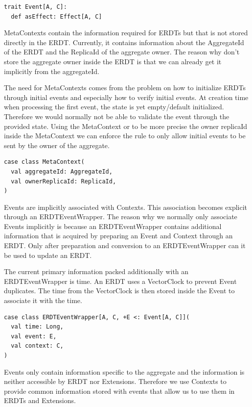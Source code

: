 \documentclass[
	ngerman,
	ruledheaders=section,   %
	class=report,		    %
	thesis={type=bachelor}, %
	accentcolor=9c,			%
	custommargins=true,    %
	marginpar=false,        %
	parskip=half-,          %
	fontsize=11pt,          %
]{tudapub}
\begin{document}
\begin{lstlisting}
trait Event[A, C]:
  def asEffect: Effect[A, C]
\end{lstlisting}

MetaContexts contain the information required for ERDTs but that is not stored directly in the ERDT. Currently, it contains information about the AggregateId of the ERDT and the ReplicaId of the aggregate owner. The reason why don't store the aggregate owner inside the ERDT is that we can already get it implicitly from the aggregateId.

The need for MetaContexts comes from the problem on how to initialize ERDTs through initial events and especially how to verify initial events. At creation time when processing the first event, the state is yet empty/default initialized. Therefore we would normally not be able to validate the event through the provided state. Using the MetaContext or to be more precise the owner replicaId inside the MetaContext we can enforce the rule to only allow initial events to be sent by the owner of the aggregate.

\begin{lstlisting}
case class MetaContext(
  val aggregateId: AggregateId,
  val ownerReplicaId: ReplicaId,
)
\end{lstlisting}

Events are implicitly associated with Contexts. This association becomes explicit through an ERDTEventWrapper. The reason why we normally only associate Events implicitly is because an ERDTEventWrapper contains additional information that is acquired by preparing an Event and Context through an ERDT. Only after preparation and conversion to an ERDTEventWrapper can it be used to update an ERDT. 

The current primary information packed additionally with an ERDTEventWrapper is time. An ERDT uses a VectorClock to prevent Event duplicates. The time from the VectorClock is then stored inside the Event to associate it with the time.

\begin{lstlisting}
case class ERDTEventWrapper[A, C, +E <: Event[A, C]](
  val time: Long,
  val event: E,
  val context: C,
)
\end{lstlisting}

Events only contain information specific to the aggregate and the information is neither accessible by ERDT nor Extensions. Therefore we use Contexts to provide common information stored with events that allow us to use them in ERDTs and Extensions. 
\end{document}
